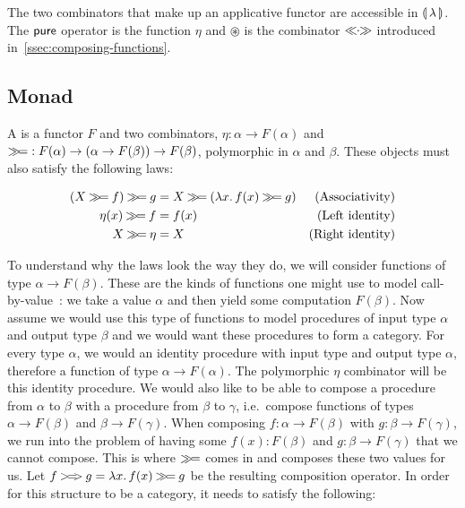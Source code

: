 The two combinators that make up an applicative functor are accessible in
$\llparenthesis \, \lambda \, \rrparenthesis$. The $\mathsf{pure}$ operator is the function $\eta$ and
$\circledast$ is the combinator $\mathbin{\ll\!\!\cdot\!\!\gg}$ introduced
in~\ref{ssec:composing-functions}.


\subsection{Monad}
\label{ssec:monad}

\begin{definition}
  A  is a functor $F$ and two combinators,
  $\eta : \alpha \to F(\alpha)$ and
  $\mathbin{\gg\!=} : F(\alpha) \to (\alpha \to F(\beta)) \to F(\beta)$, polymorphic
  in $\alpha$ and $\beta$. These objects must also satisfy the following
  laws:

  \begin{align}
    (X \mathbin{\gg\!=} f) \mathbin{\gg\!=} g &= X \mathbin{\gg\!=} (\lambda x.\, f(x) \mathbin{\gg\!=} g)
    & \label{law:monad-assoc} \text{(Associativity)} \\
    \eta(x) \mathbin{\gg\!=} f &= f(x)
    & \label{law:monad-left-id} \text{(Left identity)} \\
    X \mathbin{\gg\!=} \eta &= X
    & \label{law:monad-right-id} \text{(Right identity)}
  \end{align}
\end{definition}

To understand why the laws look the way they do, we will consider functions
of type $\alpha \to F(\beta)$. These are the kinds of functions one might
use to model call-by-value~\cite{moggi1991notions,moggi1990abstract}: we
take a value $\alpha$ and then yield some computation $F(\beta)$. Now
assume we would use this type of functions to model procedures of input
type $\alpha$ and output type $\beta$ and we would want these procedures to
form a category. For every type $\alpha$, we would an identity procedure
with input type and output type $\alpha$, therefore a function of type
$\alpha \to F(\alpha)$. The polymorphic $\eta$ combinator will be this
identity procedure. We would also like to be able to compose a procedure
from $\alpha$ to $\beta$ with a procedure from $\beta$ to $\gamma$, i.e.\
compose functions of types $\alpha \to F(\beta)$ and $\beta \to
F(\gamma)$. When composing $f : \alpha \to F(\beta)$ with
$g : \beta \to F(\gamma)$, we run into the problem of having some
$f(x) : F(\beta)$ and $g : \beta \to F(\gamma)$ that we cannot
compose. This is where $\mathbin{\gg\!=}$ comes in and composes these two values for
us. Let $f \mathbin{>\!=\!\!>} g = \lambda x.\, f(x) \mathbin{\gg\!=} g$ be the resulting
composition operator. In order for this structure to be a category, it
needs to satisfy the following:

